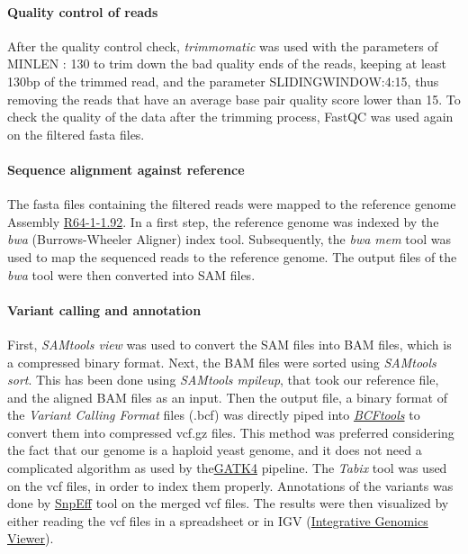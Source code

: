 \documentclass[10pt,a4paper]{article}
\begin{document}
\paragraph{Quality control of reads} After the quality control check, \textit{trimmomatic}\cite{bolger_trimmomatic:_2014} was used with the parameters of MINLEN : 130 to trim down the bad quality ends of the reads, keeping at least 130bp of the trimmed read, and the parameter SLIDINGWINDOW:4:15, thus removing the reads that have an average base pair quality score lower than 15. To check the quality of the data after the trimming process, FastQC was used again on the filtered fasta files.

\paragraph{Sequence alignment against reference} The fasta files containing the filtered reads were mapped to the reference genome Assembly \href{https://www.ensembl.org/Saccharomyces_cerevisiae/Info/Index}{R64-1-1.92}. In a first step, the reference genome was indexed by the \textit{bwa} (Burrows-Wheeler Aligner) index tool\cite{li_fast_2010}. Subsequently, the \textit{bwa mem} tool was used to map the sequenced reads to the reference genome. The output files of the \textit{bwa} tool were then converted into SAM files\cite{li_sequence_2009}.
 
\paragraph{Variant calling and annotation}
First, \textit{SAMtools view}\cite{li_sequence_2009} was used to convert the SAM files into BAM files, which is a compressed binary format. Next, the BAM files were sorted using \textit{SAMtools sort}. This has been done using \textit{SAMtools mpileup}, that took our reference file, and the aligned BAM files as an input. Then the output file, a binary format of the \textit{Variant Calling Format} files (.bcf) was directly piped into \href{www.http://www.htslib.org/}{\textit{BCFtools}} to convert them into compressed vcf.gz files. This method was preferred considering the fact that our genome is a haploid yeast genome, and it does not need a complicated algorithm as used by the\href{https://software.broadinstitute.org/gatk/}{GATK4} pipeline. The \textit{Tabix}\cite{li_tabix:_2011} tool was used on the vcf files, in order to index them properly. Annotations of the variants was done by \href{http://snpeff.sourceforge.net/}{SnpEff} tool on the merged vcf files. The results were then visualized by either reading the vcf files in a spreadsheet or in IGV (\href{http://software.broadinstitute.org/software/igv/}{Integrative Genomics Viewer}).\\
\end{document}
